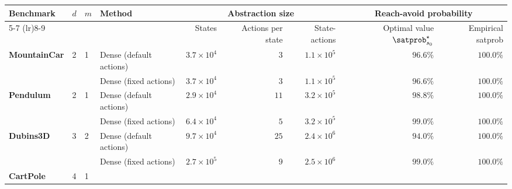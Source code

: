 \begin{tabular}{llll rrr rr}
\toprule
\multirow{2}{*}{\textbf{Benchmark}} & \multirow{2}{*}{$d$} & \multirow{2}{*}{$m$} & \multirow{2}{*}{\textbf{Method}} & \multicolumn{3}{c}{\textbf{Abstraction size}} & \multicolumn{2}{c}{\textbf{Reach-avoid probability}} \\
\cmidrule(lr){5-7} \cmidrule(lr){8-9}
& & & & States & Actions per state & State-actions & Optimal value $\satprob^\star_{s_0}$ & Empirical satprob \\
\midrule
\multirow{2}{*}{\textbf{MountainCar}} & \multirow{2}{*}{2} & \multirow{2}{*}{1}
 & Dense (default actions) & $3.7 \times 10^{4}$ & $3$ & $1.1 \times 10^{5}$ & $96.6\%$ & $100.0\%$ \\
 & & & Dense (fixed actions) & $3.7 \times 10^{4}$ & $3$ & $1.1 \times 10^{5}$ & $96.6\%$ & $100.0\%$ \\
\midrule
\multirow{2}{*}{\textbf{Pendulum}} & \multirow{2}{*}{2} & \multirow{2}{*}{1}
 & Dense (default actions) & $2.9 \times 10^{4}$ & $11$ & $3.2 \times 10^{5}$ & $98.8\%$ & $100.0\%$ \\
 & & & Dense (fixed actions) & $6.4 \times 10^{4}$ & $5$ & $3.2 \times 10^{5}$ & $99.0\%$ & $100.0\%$ \\
\midrule
\multirow{2}{*}{\textbf{Dubins3D}} & \multirow{2}{*}{3} & \multirow{2}{*}{2}
 & Dense (default actions) & $9.7 \times 10^{4}$ & $25$ & $2.4 \times 10^{6}$ & $94.0\%$ & $100.0\%$ \\
 & & & Dense (fixed actions) & $2.7 \times 10^{5}$ & $9$ & $2.5 \times 10^{6}$ & $99.0\%$ & $100.0\%$ \\
\midrule
\multirow{2}{*}{\textbf{CartPole}} & \multirow{2}{*}{4} & \multirow{2}{*}{1}

\end{tabular}
